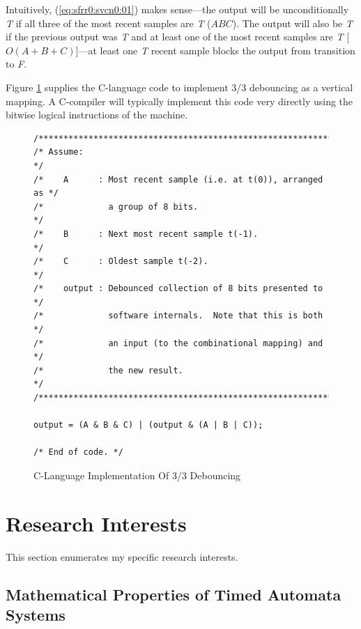 \documentclass[letterpaper,10pt,titlepage]{article}
\begin{document}
Intuitively, (\ref{eq:sfrr0:svcn0:01}) makes sense---the output 
will be unconditionally \emph{T} if all three of the most recent samples 
are \emph{T}
($ABC$).  The output will also be \emph{T} if the previous output was \emph{T}
and at least one of the most recent samples are \emph{T} [$O(A+B+C)$]---at least
one \emph{T} recent sample blocks the output from transition to \emph{F}.

Figure \ref{fig:sfrr0:svcn0:01} supplies the C-language
code to implement 3/3 debouncing as a vertical mapping.
A C-compiler will typically implement this code very directly
using the bitwise logical instructions of the machine.

\begin{figure}
\begin{verbatim}
/**************************************************************/
/* Assume:                                                    */
/*    A      : Most recent sample (i.e. at t(0)), arranged as */
/*             a group of 8 bits.                             */
/*    B      : Next most recent sample t(-1).                 */
/*    C      : Oldest sample t(-2).                           */
/*    output : Debounced collection of 8 bits presented to    */
/*             software internals.  Note that this is both    */
/*             an input (to the combinational mapping) and    */
/*             the new result.                                */
/**************************************************************/

output = (A & B & C) | (output & (A | B | C));

/* End of code. */
\end{verbatim}
\caption{C-Language Implementation Of 3/3 Debouncing}
\label{fig:sfrr0:svcn0:01}
\end{figure}



\section{Research Interests}
\label{srin0}

This section enumerates my specific research interests.



\subsection{Mathematical Properties of Timed Automata Systems}
\label{srin0:star0}
\end{document}
